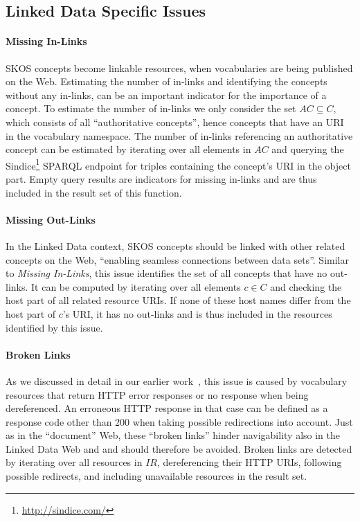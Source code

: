 \subsection{Linked Data Specific Issues}\label{subsec:ld_issues}

\paragraph{Missing In-Links}

SKOS concepts become linkable resources, when vocabularies are being published on the Web. Estimating the number of in-links and identifying the concepts without any in-links, can be an important indicator for the importance of a concept.
To estimate the number of in-links we only consider the set $AC \subseteq C$, which consists of all ``authoritative concepts'', hence concepts that have an URI in the vocabulary namespace. The number of in-links referencing an authoritative concept can be estimated by iterating over all elements in $AC$ and querying the Sindice\footnote{\url{http://sindice.com/}} SPARQL endpoint for triples containing the concept's URI in the object part. Empty query results are indicators for missing in-links and are thus included in the result set of this function.

\paragraph{Missing Out-Links}

In the Linked Data context, SKOS concepts should be linked with other related concepts on the Web, ``enabling seamless connections between data sets''\cite{Heath2011}. Similar to \emph{Missing In-Links}, this issue identifies the set of all concepts that have no out-links.
It can be computed by iterating over all elements $c \in C$ and checking the host part of all related resource URIs. If none of these host names differ from the host part of $c$'s URI, it has no out-links and is thus included in the resources identified by this issue.

\paragraph{Broken Links}

As we discussed in detail in our earlier work~\cite{Popitsch:2010:DHB:1772690.1772768}, this issue is caused by vocabulary resources that return HTTP error responses or no response when being dereferenced. An erroneous HTTP response in that case can be defined as a response code other than 200 when taking possible redirections into account. Just as in the ``document'' Web, these ``broken links'' hinder navigability also in the Linked Data Web and and should therefore be avoided. 
Broken links are detected by iterating over all resources in $IR$, dereferencing their HTTP URIs, following possible redirects, and including unavailable resources in the result set.


